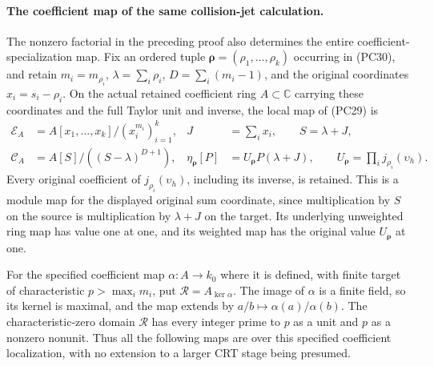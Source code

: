 \paragraph{The coefficient map of the same collision-jet calculation.}
The nonzero factorial in the preceding proof also determines the
entire coefficient-specialization map.  Fix an ordered tuple
\(\boldsymbol\rho=(\rho_1,\ldots,\rho_k)\) occurring in (PC30),
and retain \(m_i=m_{\rho_i}\), \(\lambda=\sum_i\rho_i\),
\(D=\sum_i(m_i-1)\), and the original coordinates
\(x_i=s_i-\rho_i\).  On the actual retained coefficient ring
\(A\subset\mathbb C\) carrying these coordinates and the full
Taylor unit and inverse, the local map of (PC29) is
\[
\begin{aligned}
 \mathcal E_A&=A[x_1,\ldots,x_k]/(x_i^{m_i})_{i=1}^k,
 &J&=\sum_i x_i,\qquad S=\lambda+J,\\
 \mathcal C_A&=A[S]/((S-\lambda)^{D+1}),
 &\eta_{\boldsymbol\rho}[P]&=U_{\boldsymbol\rho}P(\lambda+J),
 \qquad U_{\boldsymbol\rho}=\prod_i j_{\rho_i}(\upsilon_h).
\end{aligned}
\tag{PC30a}\label{eq:pc30a-update}
\]
Every original coefficient of \(j_{\rho_i}(\upsilon_h)\),
including its inverse, is retained.  This is a module map for
the displayed original sum coordinate, since multiplication
by \(S\) on the source is multiplication by \(\lambda+J\)
on the target.  Its underlying unweighted ring map has value
one at one, and its weighted map has the original value
\(U_{\boldsymbol\rho}\) at one.

For the specified coefficient map \(\alpha:A\to k_0\) where
it is defined, with finite target of characteristic
\(p>\max_i m_i\), put \(\mathscr R=A_{\ker\alpha}\).
The image of \(\alpha\) is a finite field, so its kernel is
maximal, and the map extends by
\(a/b\mapsto\alpha(a)/\alpha(b)\).  The characteristic-zero
domain \(\mathscr R\) has every integer prime to \(p\) as
a unit and \(p\) as a nonzero nonunit.  Thus all the following
maps are over this specified coefficient localization, with
no extension to a larger CRT stage being presumed.

